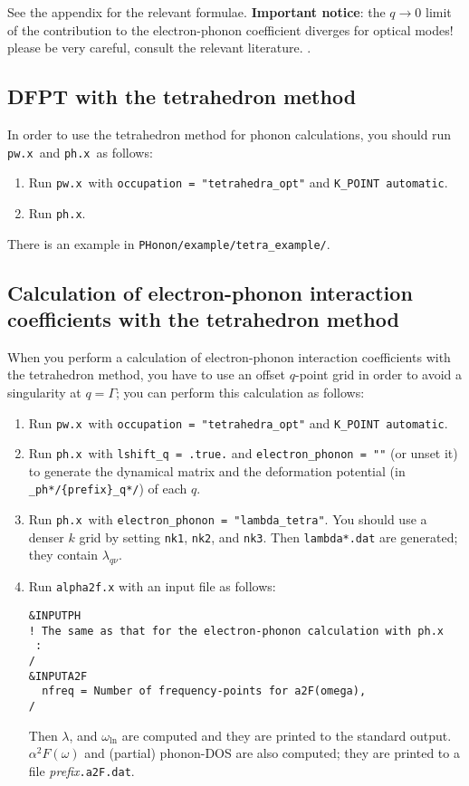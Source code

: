 \documentclass[12pt,a4paper]{article}
\def\pwx{\texttt{pw.x}}
\def\phx{\texttt{ph.x}}
\begin{document}
See the appendix for the relevant formulae.
{\bf Important notice}: the $q\rightarrow 0$ limit of the contribution 
to the electron-phonon coefficient diverges for optical modes! please 
be very careful, consult the relevant literature. . 

\subsection{DFPT with the tetrahedron method}

In order to use the tetrahedron method for phonon calculations,
you should run \pwx\ and \phx\ as follows:
\begin{enumerate}
  \item Run \pwx\ with \verb|occupation = "tetrahedra_opt"| and \verb|K_POINT automatic|.
  \item Run \phx.
\end{enumerate}

There is an example in \verb|PHonon/example/tetra_example/|.

\subsection{Calculation of electron-phonon interaction coefficients with the tetrahedron method}

When you perform a calculation of electron-phonon interaction coefficients 
with the tetrahedron method,
you have to use an offset $q$-point grid in order to avoid a singularity 
at $q=\Gamma$; you can perform this calculation as follows:

\begin{enumerate}
  \item Run \pwx\ with \verb|occupation = "tetrahedra_opt"| and \verb|K_POINT automatic|.
  \item Run \phx\ with \verb|lshift_q = .true.| and \verb|electron_phonon = ""| (or unset it)
    to generate the dynamical matrix and
    the deformation potential (in \verb|_ph*/{prefix}_q*/|) of each $q$.
  \item Run \phx\ with \verb|electron_phonon = "lambda_tetra"|.
    You should use a denser $k$ grid by setting \verb|nk1|, \verb|nk2|, and \verb|nk3|.
    Then \verb|lambda*.dat| are generated; they contain $\lambda_{q \nu}$.
  \item Run \verb|alpha2f.x| with an input file as follows:
\begin{verbatim}
&INPUTPH
! The same as that for the electron-phonon calculation with ph.x
 :
/
&INPUTA2F
  nfreq = Number of frequency-points for a2F(omega), 
/
\end{verbatim}
Then $\lambda$, and $\omega_{\ln}$ are computed and they are printed to the standard output.
$\alpha^2F(\omega)$ and (partial) phonon-DOS are also computed;
they are printed to a file \textit{prefix}\verb|.a2F.dat|.
\end{enumerate}
\end{document}
